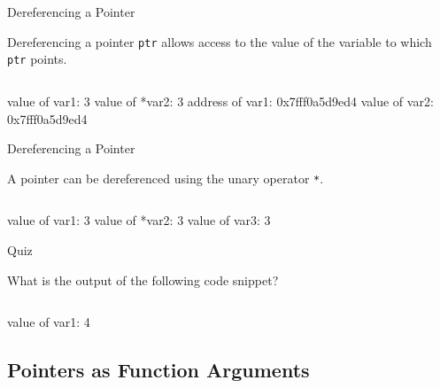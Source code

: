 \documentclass[compress]{beamer}
\begin{document}
\begin{slide}
	\begin{block}{Dereferencing a Pointer}

	Dereferencing a pointer \texttt{ptr} allows access to the value of the variable to which \texttt{ptr} points.

	\inputminted[fontsize=\footnotesize, firstline=14, lastline=16, linenos]{c}{
		\resDirectory/ls10-point2.c
	}

	\begin{terminal}
	value of var1: 3
	value of *var2: 3
	address of var1: 0x7fff0a5d9ed4
	value of var2: 0x7fff0a5d9ed4
	\end{terminal}

	\end{block}
\end{slide}

\begin{slide}
	\begin{block}{Dereferencing a Pointer}

	A pointer can be dereferenced using the unary operator \alert{\texttt{*}}.

	\inputminted[fontsize=\footnotesize, firstline=14, lastline=17, linenos]{c}{
		\resDirectory/ls10-point2.c
	}

	\begin{terminal}
	value of var1: 3
	value of *var2: 3
	value of var3: 3
	\end{terminal}

	\end{block}
\end{slide}

\begin{slide}
	\begin{block}{Quiz}

	What is the output of the following code snippet?

	\inputminted[fontsize=\footnotesize, firstline=10, linenos]{c}{
		\resDirectory/ls10-point3.c
	}

	\pause

	\begin{terminal}
	value of var1: 4
	\end{terminal}

	\end{block}
\end{slide}

\subsection{Pointers as Function Arguments}
\end{document}
